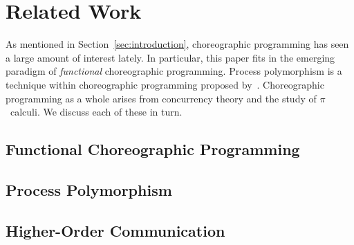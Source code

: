 \section{Related Work}
\label{sec:related-work}

As mentioned in Section~\ref{sec:introduction}, choreographic programming has seen a large amount of interest lately.
In particular, this paper fits in the emerging paradigm of \emph{functional} choreographic programming.
Process polymorphism is a technique within choreographic programming proposed by~\citet{GraversenHM24}.
Choreographic programming as a whole arises from concurrency theory and the study of $\pi$~calculi.
We discuss each of these in turn.

\subsection{Functional Choreographic Programming}
\label{sec:choreo-prog}

\subsection{Process Polymorphism}
\label{sec:process-poly}

\subsection{Higher-Order Communication}
\label{sec:higher-order-comm}